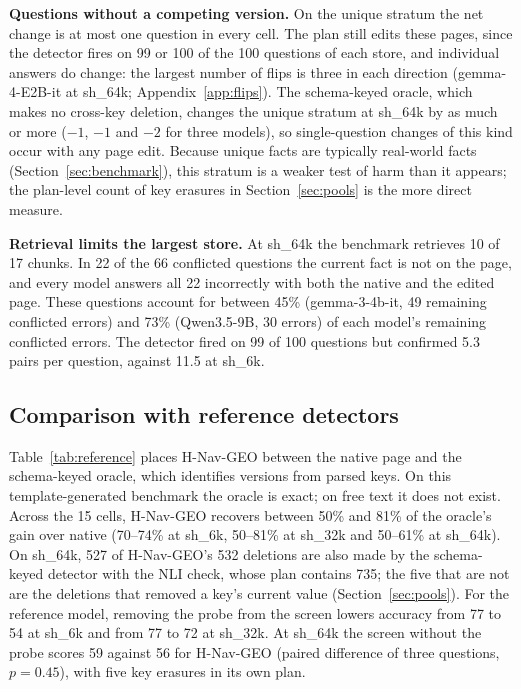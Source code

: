 \documentclass{CUP-JNL-NLP}
\newcommand{\sub}[1]{\textsf{sh\_#1}}                    %
\newcommand{\geo}{H-Nav-GEO}
\begin{document}
\textbf{Questions without a competing version.} On the unique stratum the net change is at most one question in every cell. The plan still edits these pages, since the detector fires on 99 or 100 of the 100 questions of each store, and individual answers do change: the largest number of flips is three in each direction (gemma-4-E2B-it at \sub{64k}; Appendix~\ref{app:flips}). The schema-keyed oracle, which makes no cross-key deletion, changes the unique stratum at \sub{64k} by as much or more ($-1$, $-1$ and $-2$ for three models), so single-question changes of this kind occur with any page edit. Because unique facts are typically real-world facts (Section~\ref{sec:benchmark}), this stratum is a weaker test of harm than it appears; the plan-level count of key erasures in Section~\ref{sec:pools} is the more direct measure.

\textbf{Retrieval limits the largest store.} At \sub{64k} the benchmark retrieves 10 of 17 chunks. In 22 of the 66 conflicted questions the current fact is not on the page, and every model answers all 22 incorrectly with both the native and the edited page. These questions account for between 45\% (gemma-3-4b-it, 49 remaining conflicted errors) and 73\% (Qwen3.5-9B, 30 errors) of each model's remaining conflicted errors. The detector fired on 99 of 100 questions but confirmed 5.3 pairs per question, against 11.5 at \sub{6k}.

\subsection{Comparison with reference detectors}
\label{sec:reference}

Table~\ref{tab:reference} places \geo{} between the native page and the schema-keyed oracle, which identifies versions from parsed keys. On this template-generated benchmark the oracle is exact; on free text it does not exist. Across the 15 cells, \geo{} recovers between 50\% and 81\% of the oracle's gain over native (70--74\% at \sub{6k}, 50--81\% at \sub{32k} and 50--61\% at \sub{64k}). On \sub{64k}, 527 of \geo{}'s 532 deletions are also made by the schema-keyed detector with the NLI check, whose plan contains 735; the five that are not are the deletions that removed a key's current value (Section~\ref{sec:pools}). For the reference model, removing the probe from the screen lowers accuracy from 77 to 54 at \sub{6k} and from 77 to 72 at \sub{32k}. At \sub{64k} the screen without the probe scores 59 against 56 for \geo{} (paired difference of three questions, $p=0.45$), with five key erasures in its own plan.
\end{document}
